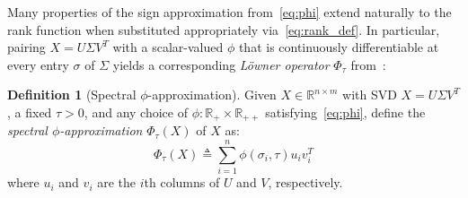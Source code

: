\documentclass[10pt]{article}
\numberwithin{equation}{section}
\newcommand{\+}{%
	\raisebox{0.18ex}{\scaleobj{0.55}{+}}
}
\theoremstyle{definition}
\newtheorem{definition}{Definition}
\theoremstyle{definition}
\begin{document}
Many properties of the sign approximation from~\eqref{eq:phi} extend naturally to the rank function when substituted appropriately via~\eqref{eq:rank_def}. In particular, pairing $X = U\Sigma V^T$ with a scalar-valued $\phi$ that is continuously differentiable at every entry $\sigma$ of $\Sigma$ yields a corresponding \emph{Löwner operator} $\Phi_\tau$ from~\cite{bhatia2013matrix, bi2013approximation}: 
\begin{definition}[Spectral $\phi$-approximation]
	Given $X \in \mathbb{R}^{n \times m}$ with SVD $X = U \Sigma V^T$, a fixed $\tau > 0$, and any choice of $\phi: \mathbb{R}_+ \times \mathbb{R}_{++}$ satisfying~\eqref{eq:phi}, define the \emph{spectral $\phi$-approximation} $\Phi_\tau(X)$ of $X$ as:
	\begin{equation}\label{def:lowner}%
		\Phi_\tau (X) \triangleq \sum\limits_{i=1}^{n} \phi(\sigma_i, \tau) u_i v_i^T
	\end{equation}
	where $u_i$ and $v_i$ are the $i$th columns of $U$ and $V$, respectively. 
\end{definition}
\end{document}
